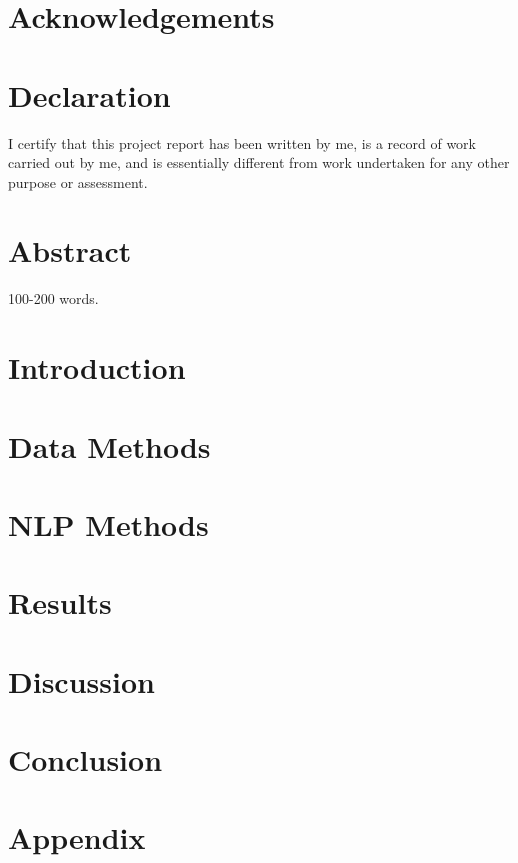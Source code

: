 \documentclass[]{report}
\newcommand\blankpage{%
    \null
    \thispagestyle{empty}%
    \addtocounter{page}{-1}%
    \newpage}
\begin{document}

\tableofcontents
\afterpage{\blankpage}

\chapter*{Acknowledgements}

\chapter*{Declaration}
I certify that this project report has been written by me, is a record of work carried out by me, and is essentially different from work undertaken for any other purpose or assessment.

\chapter*{Abstract}
100-200 words.

\chapter{Introduction} %

 
\chapter{Data Methods} %


 
\chapter{NLP Methods} \label{methods}%



 
\chapter{Results} %


 
\chapter{Discussion} %


 
\chapter{Conclusion}





\appendix
\chapter{Appendix}
\end{document}
